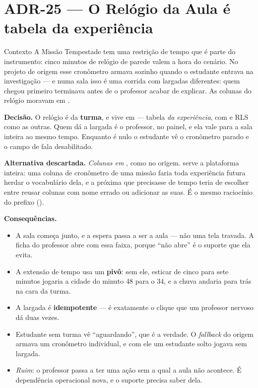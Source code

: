 \section{ADR-25 --- O Relógio da Aula é tabela da experiência}
\label{adr:relogio-turma}

\begin{especificacao}{Contexto}
A Missão Tempestade tem uma restrição de tempo que é parte do instrumento: cinco
minutos de relógio de parede valem a hora do cenário. No projeto de origem esse
cronômetro armava sozinho quando o estudante entrava na investigação --- e numa sala
isso é uma corrida com largadas diferentes: quem chegou primeiro terminava antes
de o professor acabar de explicar. As colunas do relógio moravam em
.
\end{especificacao}

\textbf{Decisão.} O relógio é da \textbf{turma}, e vive em
 --- tabela \emph{da experiência}, com
 e RLS como as outras. Quem dá a largada é o professor, no painel,
e ela vale para a sala inteira ao mesmo tempo. Enquanto  é nulo o
estudante vê o cronômetro parado e o campo de fala desabilitado.

\textbf{Alternativa descartada.} \emph{Colunas em }, como no origem.
 serve a plataforma inteira: uma coluna de cronômetro de uma missão
faria toda experiência futura herdar o vocabulário dela, e a próxima que
precisasse de tempo teria de escolher entre reusar colunas com nome errado ou
adicionar as suas. É o mesmo raciocínio do prefixo 
().

\textbf{Consequências.}
\begin{itemize}
  \item A sala começa junto, e a espera passa a ser a aula --- não uma tela
    travada. A ficha do professor abre com essa faixa, porque \enquote{não abre}
    é o suporte que ela evita.
  \item A extensão de tempo usa um \textbf{pivô}: sem ele, esticar de cinco para
    sete minutos jogaria a cidade do minuto 48 para o 34, e a chuva andaria para
    trás na cara da turma.
  \item A largada é \textbf{idempotente} --- é exatamente o clique que um
    professor nervoso dá duas vezes.
  \item Estudante sem turma vê \enquote{aguardando}, que é a verdade. O
    \emph{fallback} do origem armava um cronômetro individual, e com ele um estudante
    solto jogava sem largada.
  \item \emph{Ruim}: o professor passa a ter uma ação sem a qual a aula não
    acontece. É dependência operacional nova, e o suporte precisa saber dela.
\end{itemize}


